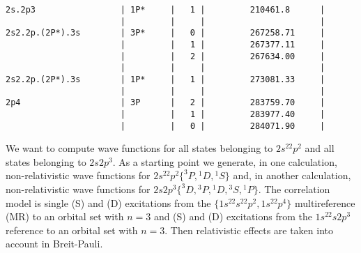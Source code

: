 \documentclass[fleqn,10pt]{book}
\begin{document}
\begin{verbatim}
2s.2p3                 | 1P*     |   1 |         210461.8      |          
                       |         |     |                       |           
2s2.2p.(2P*).3s        | 3P*     |   0 |         267258.71     |          
                       |         |   1 |         267377.11     |          
                       |         |   2 |         267634.00     |          
                       |         |     |                       |           
2s2.2p.(2P*).3s        | 1P*     |   1 |         273081.33     |          
                       |         |     |                       |           
2p4                    | 3P      |   2 |         283759.70     |          
                       |         |   1 |         283977.40     |          
                       |         |   0 |         284071.90     |      
\end{verbatim}
We want to compute wave functions for all states belonging to $2s^22p^2$ and all states belonging to $2s2p^3$.
As a starting point we generate, in one calculation, non-relativistic wave functions for $2s^22p^2\{^3P, {^1D}, {^1S}\}$ and, in another calculation, non-relativistic wave functions for
$2s2p^3\{^3D,{^3P},{^1D},{^3S},{^1P}\}$. The correlation model is single (S) and (D) excitations from the 
$\{1s^22s^22p^2,1s^22p^4\}$ multireference (MR) to an orbital set with $n=3$ and  (S) and (D) excitations from the 
$1s^22s2p^3$ reference to an orbital set with $n=3$. 
Then relativistic effects are taken into account in Breit-Pauli.                       
\end{document}

